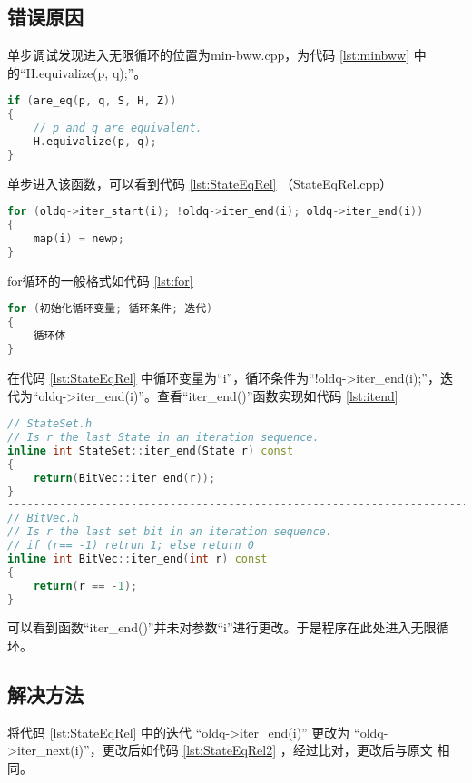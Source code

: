 \subsection{错误原因} 

单步调试发现进入无限循环的位置为min-bww.cpp，为代码 \ref{lst:minbww} 中的“H.equivalize(p, q);”。

\begin{lstlisting}[language=C++,label={lst:minbww},caption={min-bww.cpp}]
if (are_eq(p, q, S, H, Z))
{
    // p and q are equivalent.
    H.equivalize(p, q);
}
\end{lstlisting}
单步进入该函数，可以看到代码 \ref{lst:StateEqRel} （StateEqRel.cpp）

\begin{lstlisting}[language=C++,label={lst:StateEqRel},caption={StateEqRel.cpp}]
for (oldq->iter_start(i); !oldq->iter_end(i); oldq->iter_end(i))
{
    map(i) = newp;
}
\end{lstlisting}
for循环的一般格式如代码 \ref{lst:for}

\begin{lstlisting}[language=C++,label={lst:for},caption={for 循环的一般格式}]
for (初始化循环变量; 循环条件; 迭代)
{
    循环体
}
\end{lstlisting}
在代码 \ref{lst:StateEqRel} 中循环变量为“i”，循环条件为“!oldq->iter\_end(i);”，迭代为“oldq->iter\_end(i)”。查看“iter\_end()”函数实现如代码 \ref{lst:itend}

\begin{lstlisting}[language=C++,label={lst:itend},caption={函数 iter\_end() 的实现}]
// StateSet.h
// Is r the last State in an iteration sequence.
inline int StateSet::iter_end(State r) const
{
	return(BitVec::iter_end(r));
}
---------------------------------------------------------------------------
// BitVec.h
// Is r the last set bit in an iteration sequence.
// if (r== -1) retrun 1; else return 0
inline int BitVec::iter_end(int r) const
{
	return(r == -1);
}
\end{lstlisting}
可以看到函数“iter\_end()”并未对参数“i”进行更改。于是程序在此处进入无限循环。

\subsection{解决方法}

将代码 \ref{lst:StateEqRel} 中的迭代 “oldq->iter\_end(i)” 更改为 “oldq->iter\_next(i)”，更改后如代码 \ref{lst:StateEqRel2} ，经过比对，更改后与原文 \cite{watson1994design} 相同。

